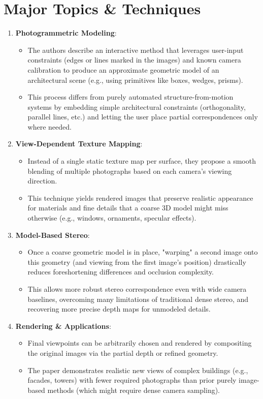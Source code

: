 \documentclass[12pt]{article}
\begin{document}
\section{Major Topics \& Techniques}
\begin{enumerate}[noitemsep]
    \item \textbf{Photogrammetric Modeling}:
    \begin{itemize}[noitemsep]
        \item The authors describe an interactive method that leverages user-input constraints (edges or lines marked in the images) and known camera calibration to produce an approximate geometric model of an architectural scene (e.g., using primitives like boxes, wedges, prisms).
        \item This process differs from purely automated structure-from-motion systems by embedding simple architectural constraints (orthogonality, parallel lines, etc.) and letting the user place partial correspondences only where needed.
    \end{itemize}
    \item \textbf{View-Dependent Texture Mapping}:
    \begin{itemize}[noitemsep]
        \item Instead of a single static texture map per surface, they propose a smooth blending of multiple photographs based on each camera's viewing direction.
        \item This technique yields rendered images that preserve realistic appearance for materials and fine details that a coarse 3D model might miss otherwise (e.g., windows, ornaments, specular effects).
    \end{itemize}
    \item \textbf{Model-Based Stereo}:
    \begin{itemize}[noitemsep]
        \item Once a coarse geometric model is in place, "warping" a second image onto this geometry (and viewing from the first image's position) drastically reduces foreshortening differences and occlusion complexity.
        \item This allows more robust stereo correspondence even with wide camera baselines, overcoming many limitations of traditional dense stereo, and recovering more precise depth maps for unmodeled details.
    \end{itemize}
    \item \textbf{Rendering \& Applications}:
    \begin{itemize}[noitemsep]
        \item Final viewpoints can be arbitrarily chosen and rendered by compositing the original images via the partial depth or refined geometry.
        \item The paper demonstrates realistic new views of complex buildings (e.g., facades, towers) with fewer required photographs than prior purely image-based methods (which might require dense camera sampling).
    \end{itemize}
\end{enumerate}
\end{document}
